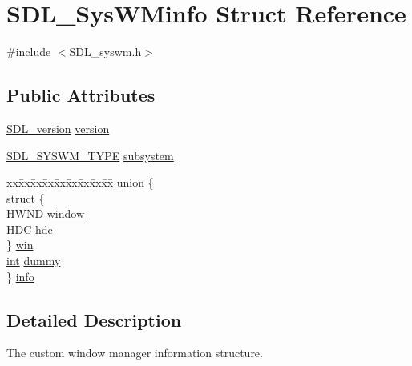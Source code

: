 \hypertarget{struct_s_d_l___sys_w_minfo}{}\section{S\+D\+L\+\_\+\+Sys\+W\+Minfo Struct Reference}
\label{struct_s_d_l___sys_w_minfo}


{\ttfamily \#include $<$S\+D\+L\+\_\+syswm.\+h$>$}

\subsection*{Public Attributes}
\begin{DoxyCompactItemize}
\item 
\hyperlink{struct_s_d_l__version}{S\+D\+L\+\_\+version} \hyperlink{struct_s_d_l___sys_w_minfo_ac3a70af022d4849e9ff546595e94627f}{version}
\item 
\hyperlink{_s_d_l__syswm_8h_a064c26598287280fff2a00d6758ac4f7}{S\+D\+L\+\_\+\+S\+Y\+S\+W\+M\+\_\+\+T\+Y\+PE} \hyperlink{struct_s_d_l___sys_w_minfo_a438b6a06ab3ee417293c7b7fc5a23855}{subsystem}
\item 
\begin{tabbing}
xx\=xx\=xx\=xx\=xx\=xx\=xx\=xx\=xx\=\kill
union \{\\
\>struct \{\\
\>\>HWND \hyperlink{struct_s_d_l___sys_w_minfo_af06225591ff07e837bbd037728a525b9}{window}\\
\>\>HDC \hyperlink{struct_s_d_l___sys_w_minfo_a5c9d0745b083422834681e99c38b803e}{hdc}\\
\>\} \hyperlink{struct_s_d_l___sys_w_minfo_a6319c3f4bccd2505edc7023380981a27}{win}\\
\>\hyperlink{_s_d_l__thread_8h_a6a64f9be4433e4de6e2f2f548cf3c08e}{int} \hyperlink{struct_s_d_l___sys_w_minfo_a1edbb8fc4fc59081efe6070f9167c1cf}{dummy}\\
\} \hyperlink{struct_s_d_l___sys_w_minfo_a96639a5304141225509483baf5910439}{info}\\

\end{tabbing}\end{DoxyCompactItemize}


\subsection{Detailed Description}
The custom window manager information structure.

